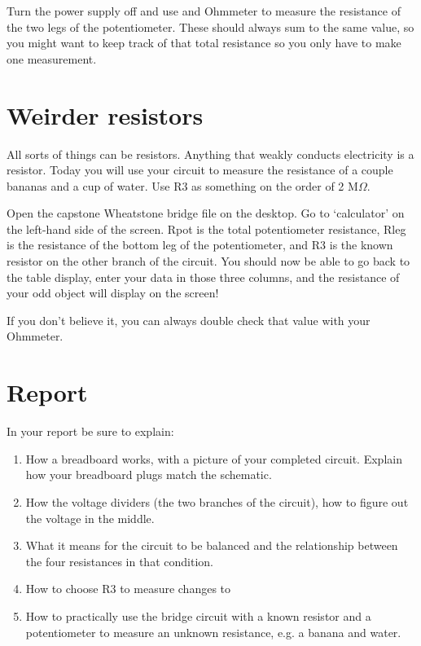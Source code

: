 \documentclass[phy1200]{handout}
\begin{document}
Turn the power supply off and use and Ohmmeter to measure the resistance of the two legs of the potentiometer. These should always sum to the same value, so you might want to keep track of that total resistance so you only have to make one measurement. 

\section{Weirder resistors}
All sorts of things can be resistors. Anything that weakly conducts electricity is a resistor. Today you will use your circuit to measure the resistance of a couple bananas and a cup of water. Use R3 as something on the order of 2 M$\Omega$. 

Open the capstone Wheatstone bridge file on the desktop. Go to `calculator' on the left-hand side of the screen. Rpot is the total potentiometer resistance, Rleg is the resistance of the bottom leg of the potentiometer, and R3 is the known resistor on the other branch of the circuit. You should now be able to go back to the table display, enter your data in those three columns, and the resistance of your odd object will display on the screen! 

If you don't believe it, you can always double check that value with your Ohmmeter.

\section{Report}

In your report be sure to explain:
\begin{enumerate}
    \item How a breadboard works, with a picture of your completed circuit. Explain how your breadboard plugs match the schematic.
    \item How the voltage dividers (the two branches of the circuit), how to figure out the voltage in the middle.
    \item What it means for the circuit to be balanced and the relationship between the four resistances in that condition.
    \item How to choose R3 to measure changes to 
    \item How to practically use the bridge circuit with a known resistor and a potentiometer to measure an unknown resistance, e.g. a banana and water.
\end{enumerate}
\end{document}
